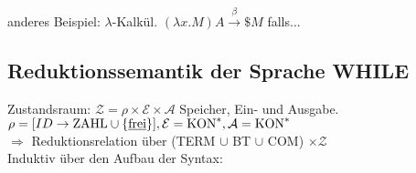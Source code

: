 anderes Beispiel: $\lambda$-Kalkül. $(\lambda x.M) A \xrightarrow{\beta}  \$ M$ falls...

\subsection{Reduktionssemantik der Sprache WHILE}
Zustandsraum: $\mathcal{Z} = \rho \times \mathcal{E} \times \mathcal{A}$ Speicher, Ein- und Ausgabe.
$\rho = [ID \rightarrow \text{ZAHL} \cup \{\text{\underline{frei}}\}], \mathcal{E}=\text{KON}^*, \mathcal{A}=\text{KON}^*$\\
$\Rightarrow$ Reduktionsrelation über (TERM $\cup$ BT $\cup$ COM) $\times \mathcal{Z}$\\
Induktiv über den Aufbau der Syntax:
